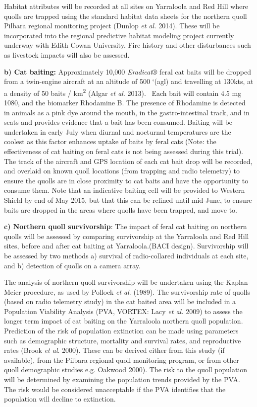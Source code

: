 \documentclass[version=last,
    paper=a4,                               %
    10pt,                                   %
    dvipsnames,
    oneside,                              %
    headings=openany,                       %
    open=any,
    BCOR=7mm,                               %
    DIV=15,     %
]{scrbook}
\begin{document}
Habitat attributes will be recorded at all sites on Yarraloola and Red
Hill where quolls are trapped using the standard habitat data sheets for
the northern quoll Pilbara regional monitoring project (Dunlop \emph{et
al.} 2014). These will be incorporated into the regional predictive
habitat modeling project currently underway with Edith Cowan University.
Fire history and other disturbances such as livestock impacts will also
be assessed.

\textbf{b) Cat baiting:} Approximately 10,000 \emph{Eradicat®} feral cat
baits will be dropped from a twin-engine aircraft at an altitude of 500
`(agl) and travelling at 130kts, at a density of 50 baits /
km\textsuperscript{2} (Algar \emph{et al}. 2013).~ Each bait will
contain 4.5 mg 1080, and the biomarker Rhodamine B. The presence of
Rhodamine is detected in animals as a pink dye around the mouth, in the
gastro-intestinal track, and in scats and provides evidence that a bait
has been consumed. Baiting will be undertaken in early July when diurnal
and nocturnal temperatures are the coolest as this factor enhances
uptake of baits by feral cats (Note: the effectiveness of cat baiting on
feral cats is not being assessed during this trial). The track of the
aircraft and GPS location of each cat bait drop will be recorded, and
overlaid on known quoll locations (from trapping and radio telemetry) to
ensure the quolls are in close proximity to cat baits and have the
opportunity to consume them. Note that an indicative baiting cell will
be provided to Western Shield by end of May 2015, but that this can be
refined until mid-June, to ensure baits are dropped in the areas where
quolls have been trapped, and move to.

\textbf{c) Northern quoll survivorship}: The impact of feral cat baiting
on northern quolls will be assessed by comparing survivorship at the
Yarraloola and Red Hill sites, before and after cat baiting at
Yarraloola.(BACI design). Survivorship will be assessed by two methods
a) survival of radio-collared individuals at each site, and b) detection
of quolls on a camera array.

The analysis of northern quoll survivorship will be undertaken using the
Kaplan-Meier procedure, as used by Pollock \emph{et al}. (1989). The
survivorship rate of quolls (based on radio telemetry study) in the cat
baited area will be included in a Population Viability Analysis (PVA,
VORTEX: Lacy \emph{et al.} 2009) to assess the longer term impact of cat
baiting on the Yarraloola northern quoll population. Prediction of the
risk of population extinction can be made using parameters such as
demographic structure, mortality and survival rates, and reproductive
rates (Brook \emph{et al}. 2000). These can be derived either from this
study (if available), from the Pilbara regional quoll monitoring
program, or from other quoll demographic studies e.g. Oakwood 2000). The
risk to the quoll population will be determined by examining the
population trends provided by the PVA. The risk would be considered
unacceptable if the PVA identifies that the population will decline to
extinction.
\end{document}
